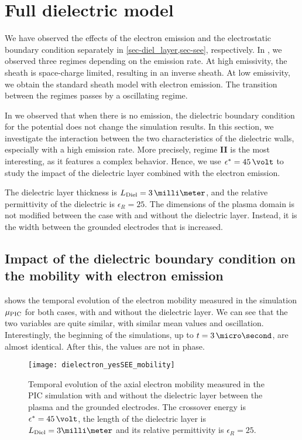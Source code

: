 
\section{Full dielectric model }
  \label{sec-fulldiel}
  
  We have observed the effects of the electron emission and the electrostatic boundary condition separately in \cref{sec-diel_layer,sec-see}, respectively.  
  In , we observed three regimes depending on the emission rate.
  At high emissivity, the sheath is space-charge limited, resulting in an inverse sheath.
  At low emissivity, we obtain the standard sheath model with electron emission.
  The transition between the regimes passes by a oscillating regime.
  
  In  we observed that when there is no emission, the dielectric boundary condition for the potential does not change the simulation results.
  In this section, we investigate the interaction between the two characteristics of the dielectric walls, especially with a high emission rate.
  More precisely, regime {\bf II} is the most interesting, as it features a complex behavior.
  Hence, we use $\crover=45\,\volt$ to study the impact of the dielectric layer combined with the electron emission.
  
  The dielectric layer thickness is $L_{\rm Diel} = 3\,\milli\meter$, and the relative permittivity of the dielectric is $\epsilon_R=25$.
  The dimensions of the plasma domain is not modified between the case with and without the dielectric layer.
  Instead, it is the width between the grounded electrodes that is increased.
  
  \subsection{Impact of the dielectric boundary condition on the mobility with electron emission}
    
     shows the temporal evolution of the electron mobility measured in the simulation $\mu_{\mathrm{PIC}}$ for both cases, with and without the dielectric layer.
    We can see that the two variables are quite similar, with similar mean values and oscillation.
    Interestingly, the beginning of the simulations, up to $t=3\,\micro\second$, are almost identical.
    After this, the values are not in phase.
    
    \begin{figure}[hbt]
      \centering
      \texttt{[image: dielectron\_yesSEE\_mobility]}
      \caption{Temporal evolution of the axial electron mobility measured in the \acs{PIC} simulation with and without the dielectric layer between the plasma and the grounded electrodes. The crossover energy is $\crover=45\,\volt$, the length of the dielectric layer is $L_{\rm Diel}=3\milli\meter$ and its relative permittivity is $\epsilon_R = 25$.  }
      \label{fig-temporal_mu} 
    \end{figure}
    
